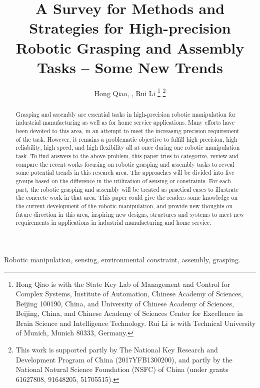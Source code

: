 \documentclass[journal,twoside,web]{ieeecolor}
\begin{document}
\title{A Survey for Methods and Strategies for High-precision Robotic Grasping and Assembly Tasks -- Some New Trends}
\author{Hong Qiao, , Rui Li
\thanks{Hong Qiao is with the State Key Lab of Management and Control for Complex Systems, Institute of Automation, Chinese Academy of Sciences, Beijing 100190, China, and University of Chinese Academy of Sciences, Beijing, China, and Chinese Academy of Sciences Center for Excellence in Brain Science and Intelligence Technology. Rui Li is with Technical University of Munich, Munich 80333, Germany.}
\thanks{This work is supported partly by The National Key Research and Development Program of China (2017YFB1300200), and partly by the National Natural Science Foundation (NSFC) of China (under grants 61627808, 91648205, 51705515).}}

\maketitle

\begin{abstract}
    Grasping and assembly are essential tasks in high-precision robotic manipulation for industrial manufacturing as well as for home service applications.     
    Many efforts have been devoted to this area, in an attempt to meet the increasing precision requirement of the task. However, it remains a problematic objective to fulfill high precision, high reliability, high speed, and high flexibility all at once during one robotic manipulation task.    
    To find answers to the above problem, this paper tries to categorize, review and compare the recent works focusing on robotic grasping and assembly tasks to reveal some potential trends in this research area. The approaches will be divided into five groups based on the difference in the utilization of sensing or constraints.     
    For each part, the robotic grasping and assembly will be treated as practical cases to illustrate the concrete work in that area.    
    This paper could give the readers some knowledge on the current development of the robotic manipulation, and provide new thoughts on future direction in this area, inspiring new designs, structures and systems to meet new requirements in applications in industrial manufacturing and home service.

\end{abstract}

\begin{IEEEkeywords}
Robotic manipulation, sensing, environmental constraint, assembly, grasping.
\end{IEEEkeywords}
\end{document}
